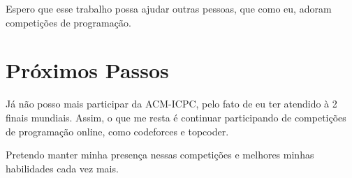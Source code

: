 \documentclass[
11pt, %
brazilian, %
singlespacing, %
]{MastersDoctoralThesis} %
\begin{document}
Espero que esse trabalho possa ajudar outras pessoas, que como eu, adoram competições de programação.


\section {Próximos Passos}
Já não posso mais participar da ACM-ICPC, pelo fato de eu ter atendido à 2 finais mundiais.
Assim, o que me resta é continuar participando de competições de programação online, como codeforces e topcoder.

Pretendo manter minha presença nessas competições e melhores minhas habilidades cada vez mais. 
\clearpage
\end{document}
